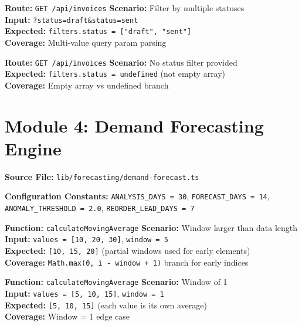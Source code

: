 ﻿\documentclass[12pt,a4paper]{report}
\newcommand{\pthree}{\textbf{\color{p3blue}P3}}
\begin{document}
\begin{tcolorbox}[testbox,title={INV-014 \hfill \pthree}]
\textbf{Route:} \texttt{GET /api/invoices} \quad \textbf{Scenario:} Filter by multiple statuses \\
\textbf{Input:} \texttt{?status=draft\&status=sent} \\
\textbf{Expected:} \texttt{filters.status = ["draft", "sent"]} \\
\textbf{Coverage:} Multi-value query param parsing
\end{tcolorbox}

\begin{tcolorbox}[testbox,title={INV-015 \hfill \pthree}]
\textbf{Route:} \texttt{GET /api/invoices} \quad \textbf{Scenario:} No status filter provided \\
\textbf{Expected:} \texttt{filters.status = undefined} (not empty array) \\
\textbf{Coverage:} Empty array vs undefined branch
\end{tcolorbox}

\section{Module 4: Demand Forecasting Engine}

\textbf{Source File:} \texttt{lib/forecasting/demand-forecast.ts}

\textbf{Configuration Constants:} \texttt{ANALYSIS\_DAYS = 30}, \texttt{FORECAST\_DAYS = 14}, \texttt{ANOMALY\_THRESHOLD = 2.0}, \texttt{REORDER\_LEAD\_DAYS = 7}

\begin{tcolorbox}[testbox,title={FORE-001 \hfill \pthree}]
\textbf{Function:} \texttt{calculateMovingAverage} \quad \textbf{Scenario:} Window larger than data length \\
\textbf{Input:} \texttt{values = [10, 20, 30]}, \texttt{window = 5} \\
\textbf{Expected:} \texttt{[10, 15, 20]} (partial windows used for early elements) \\
\textbf{Coverage:} \texttt{Math.max(0, i - window + 1)} branch for early indices
\end{tcolorbox}

\begin{tcolorbox}[testbox,title={FORE-002 \hfill \pthree}]
\textbf{Function:} \texttt{calculateMovingAverage} \quad \textbf{Scenario:} Window of 1 \\
\textbf{Input:} \texttt{values = [5, 10, 15]}, \texttt{window = 1} \\
\textbf{Expected:} \texttt{[5, 10, 15]} (each value is its own average) \\
\textbf{Coverage:} Window = 1 edge case
\end{tcolorbox}
\end{document}
